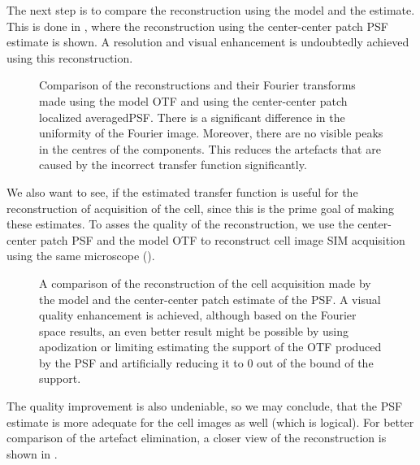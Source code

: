 The next step is to compare the reconstruction using the model and the estimate.
This is done in , where the reconstruction using the center-center patch \ac{PSF}
    estimate is shown.
A resolution and visual enhancement is undoubtedly achieved using this reconstruction.

\begin{figure}
    \caption{Comparison of the reconstructions and their Fourier transforms made using the model \ac{OTF} and using the
        center-center patch localized averaged\ac{PSF}.
        There is a significant difference in the uniformity of the Fourier image.
        Moreover, there are no visible peaks in the centres of the components.
        This reduces the artefacts that are caused by the incorrect transfer function significantly.
    }
\end{figure}

We also want to see, if the estimated transfer function is useful for the reconstruction of acquisition of the cell,
    since this is the prime goal of making these estimates.
To asses the quality of the reconstruction, we use the center-center patch \ac{PSF} and the model \ac{OTF} to 
    reconstruct cell image \ac{SIM} acquisition using the same microscope ().

\begin{figure}[h!]
    \caption{%
        A comparison of the reconstruction of the cell acquisition made by the model and the center-center patch
            estimate of the \ac{PSF}.
        A visual quality enhancement is achieved, although based on the Fourier space results, an even better result 
            might be possible by using apodization or limiting estimating the support of the \ac{OTF} produced by the 
            \ac{PSF} and artificially reducing it to \(0\) out of the bound of the support.
}
\end{figure}
\vfill

\pagebreak

The quality improvement is also undeniable, so we may conclude, that the \ac{PSF} estimate is more adequate for the cell
    images as well (which is logical).
For better comparison of the artefact elimination, a closer view of the reconstruction is shown in 
    .

